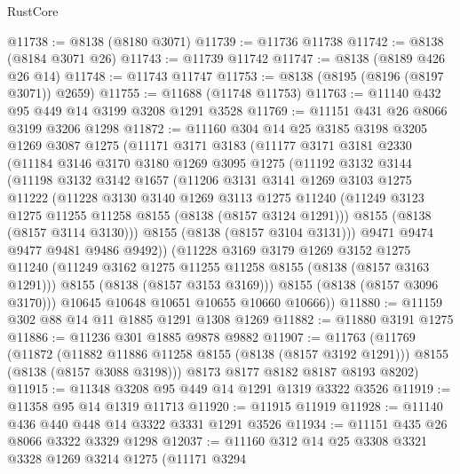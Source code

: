\begin{lexlean}{RustCore}
\begin{coremodule}
@11738 := @8138 (@8180 @3071)
@11739 := @11736 @11738
@11742 := @8138 (@8184 @3071 @26)
@11743 := @11739 @11742
@11747 := @8138 (@8189 @426 @26 @14)
@11748 := @11743 @11747
@11753 := @8138 (@8195 (@8196 (@8197 @3071)) @2659)
@11755 := @11688 (@11748 @11753)
@11763 := @11140 @432 @95 @449 @14 @3199 @3208 @1291 @3528
@11769 := @11151 @431 @26 @8066 @3199 @3206 @1298
@11872 := @11160
    @304
    @14
    @25
    @3185
    @3198
    @3205
    @1269
    @3087
    @1275
    (@11171
      @3171
      @3183
      (@11177
        @3171
        @3181
        @2330
        (@11184
          @3146
          @3170
          @3180
          @1269
          @3095
          @1275
          (@11192
            @3132
            @3144
            (@11198
              @3132
              @3142
              @1657
              (@11206
                @3131
                @3141
                @1269
                @3103
                @1275
                @11222
                (@11228
                  @3130
                  @3140
                  @1269
                  @3113
                  @1275
                  @11240
                  (@11249 @3123 @1275 @11255 @11258 @8155 (@8138 (@8157 @3124 @1291)))
                  @8155
                  (@8138 (@8157 @3114 @3130)))
                @8155
                (@8138 (@8157 @3104 @3131)))
              @9471
              @9474
              @9477
              @9481
              @9486
              @9492))
          (@11228
            @3169
            @3179
            @1269
            @3152
            @1275
            @11240
            (@11249 @3162 @1275 @11255 @11258 @8155 (@8138 (@8157 @3163 @1291)))
            @8155
            (@8138 (@8157 @3153 @3169)))
          @8155
          (@8138 (@8157 @3096 @3170)))
        @10645
        @10648
        @10651
        @10655
        @10660
        @10666))
@11880 := @11159 @302 @88 @14 @11 @1885 @1291 @1308 @1269
@11882 := @11880 @3191 @1275
@11886 := @11236 @301 @1885 @9878 @9882
@11907 := @11763
    (@11769
      (@11872
        (@11882 @11886 @11258 @8155 (@8138 (@8157 @3192 @1291)))
        @8155
        (@8138 (@8157 @3088 @3198)))
      @8173
      @8177
      @8182
      @8187
      @8193
      @8202)
@11915 := @11348 @3208 @95 @449 @14 @1291 @1319 @3322 @3526
@11919 := @11358 @95 @14 @1319 @11713
@11920 := @11915 @11919
@11928 := @11140 @436 @440 @448 @14 @3322 @3331 @1291 @3526
@11934 := @11151 @435 @26 @8066 @3322 @3329 @1298
@12037 := @11160
    @312
    @14
    @25
    @3308
    @3321
    @3328
    @1269
    @3214
    @1275
    (@11171
      @3294

\end{coremodule}
\end{lexlean}

